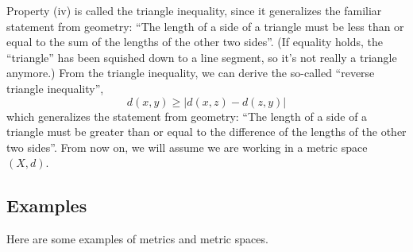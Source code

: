 \documentclass[12pt]{amsart}         %
\theoremstyle{remark}
\begin{document}
Property (iv) is called the triangle inequality, since it generalizes the familiar statement from geometry: ``The length of a side of a triangle must be less than or equal to the sum of the lengths of the other two sides''. (If equality holds, the ``triangle'' has been squished down to a line segment, so it's not really a triangle anymore.) From the triangle inequality, we can derive the so-called ``reverse triangle inequality'',
\[
d(x,y) \geq  |d(x,z) - d(z, y)|
\]
which generalizes the statement from geometry: ``The length of a side of a triangle must be greater than or equal to the difference of the lengths of the other two sides''. From now on, we will assume we are working in a metric space $(X, d)$.

\subsection{Examples}

Here are some examples of metrics and metric spaces.
\end{document}
